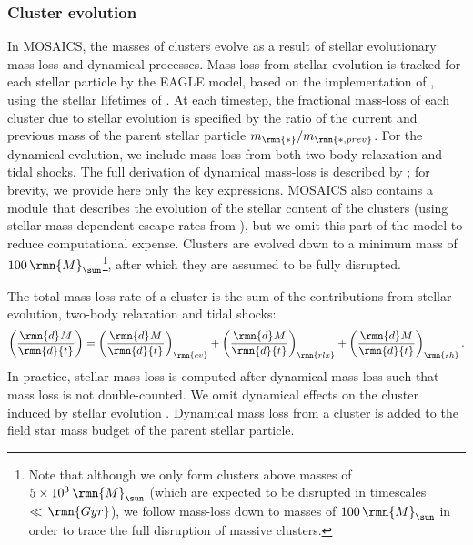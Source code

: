 \documentclass[fleqn,usenatbib]{mnras}
\newcommand\Msun{\,\rmn{M}_{\sun}}
\newcommand\Gyr{\,\rmn{Gyr}}
\newcommand{\derBr}[3][]{\left( \frac{\rmn{d}^{#1} #2}{\rmn{d} {#3}^{#1}} \right)}
\begin{document}
\subsubsection{Cluster evolution} \label{sec:clevo}

In {\sc MOSAICS}, the masses of clusters evolve as a result of stellar evolutionary mass-loss and dynamical processes. Mass-loss from stellar evolution is tracked for each stellar particle by the EAGLE model, based on the implementation of \citet{Wiersma_et_al_09}, using the stellar lifetimes of \citet{Portinari_Chiosi_and_Bressan_98}. At each timestep, the fractional mass-loss of each cluster due to stellar evolution is specified by the ratio of the current and previous mass of the parent stellar particle $m_\rmn{*}/m_\rmn{*,prev}$. For the dynamical evolution, we include mass-loss from both two-body relaxation and tidal shocks. The full derivation of dynamical mass-loss is described by \citet{Kruijssen_et_al_11}; for brevity, we provide here only the key expressions. {\sc MOSAICS} also contains a module that describes the evolution of the stellar content of the clusters (using stellar mass-dependent escape rates from \citealt{Kruijssen_09}), but we omit this part of the model to reduce computational expense. Clusters are evolved down to a minimum mass of $100 \Msun$\footnote{Note that although we only form clusters above masses of $5\times10^3 \Msun$ (which are expected to be disrupted in timescales $\ll\Gyr$), we follow mass-loss down to masses of $100 \Msun$ in order to trace the full disruption of massive clusters.}, after which they are assumed to be fully disrupted. 

The total mass loss rate of a cluster is the sum of the contributions from stellar evolution, two-body relaxation and tidal shocks:
\begin{equation} \label{eq:dmdt}
\derBr{M}{t} = \derBr{M}{t}_\rmn{ev} + \derBr{M}{t}_\rmn{rlx} + \derBr{M}{t}_\rmn{sh} .
\end{equation}
In practice, stellar mass loss is computed after dynamical mass loss such that mass loss is not double-counted. We omit dynamical effects on the cluster induced by stellar evolution \citep[i.e.~extra dynamical mass loss in response to the shrinking of the tidal radius][]{Lamers_Baumgardt_and_Gieles_10}. Dynamical mass loss from a cluster is added to the field star mass budget of the parent stellar particle.
\end{document}
